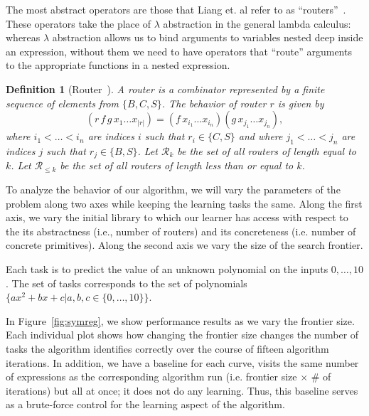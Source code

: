\documentclass{article}
\newtheorem{definition}{Definition}
\begin{document}
The most abstract operators are those that Liang et. al refer to as
``routers''~\cite{liang10programs}. These operators take the place of
$\lambda$ abstraction in the general lambda calculus: whereas
$\lambda$ abstraction allows us to bind arguments to variables nested
deep inside an expression, without them we need to have operators that
``route'' arguments to the appropriate functions in a nested
expression. 

\begin{definition}[Router~\cite{liang10programs}] A \emph{router} is a combinator
represented by a finite sequence of elements from $\{B, C, S\}$. The
behavior of router $r$ is given by
\[
(r \, f \, g \, x_1 \dots x_{|r|}) = (f \, x_{i_1} \dots x_{i_n}) (g
\, x_{j_1} \dots x_{j_n}),
\]
where $i_1 < \dots < i_n$ are indices $i$ such that $r_i \in \{C, S\}$
and where $j_1 < \dots < j_n$ are indices $j$ such that $r_j \in \{B,
S\}$. Let $\mathcal{R}_k$ be the set of all routers of length equal to
$k$. Let $\mathcal{R}_{\leq k}$ be the set of all routers of length
less than or equal to $k$.
\end{definition}

To analyze the behavior of our algorithm, we will vary the parameters
of the problem along two axes while keeping the learning tasks the
same. Along the first axis, we vary the initial library to which our
learner has access with respect to the its abstractness (i.e., number
of routers) and its concreteness (i.e. number of concrete
primitives). Along the second axis we vary the size of the search
frontier.

Each task is to predict the value of an unknown polynomial on the
inputs $0, \dots, 10$. The set of tasks corresponds to the set of
polynomials $\{ax^2 + bx + c | a, b, c \in \{0, \dots, 10 \}\}$. 

In Figure~\ref{fig:symreg}, we show performance results as we vary the
frontier size. Each individual plot shows how changing the frontier
size changes the number of tasks the algorithm identifies correctly
over the course of fifteen algorithm iterations. In addition, we have a
baseline for each curve, visits the same number of expressions as the
corresponding algorithm run (i.e. frontier size $\times$ $\#$ of
iterations) but all at once; it does not do any learning. Thus, this
baseline serves as a brute-force control for the learning aspect of
the algorithm.
\end{document}
